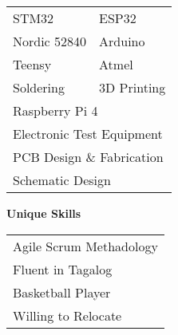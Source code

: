\documentclass[10pt,letterpaper]{article}
\def\bulletspace{0.1mm} %
\newcommand{\bulletp}{
    \textbullet \hspace{\bulletspace}
}
\begin{document}
\begin{paracol}{2}
\begin{leftcolumn}
    \vspace{-0.55em}
    \raggedright{
        \begin{table}[h!]
            \begin{tabular}{p{7em} p{7em}}
                \bulletp STM32 & \bulletp ESP32\\
                \bulletp Nordic 52840 & \bulletp Arduino\\
                \bulletp Teensy & \bulletp Atmel\\
                \bulletp Soldering & \bulletp3D Printing\\
                \multicolumn{2}{l}{\bulletp Raspberry Pi 4}\\
                \multicolumn{2}{l}{\bulletp Electronic Test Equipment}\\
                \multicolumn{2}{l}{\bulletp PCB Design \& Fabrication}\\
                \multicolumn{2}{l}{\bulletp Schematic Design}\\
            \end{tabular}
        \end{table}
    }
    \vspace{-10pt}
    \large{\textbf{Unique Skills} }\\
    \vspace{-0.55em}
    \raggedright{
        \begin{table}[h!]
            \begin{tabular}{p{14em}}
                \bulletp Agile Scrum Methadology\\
                \bulletp Fluent in Tagalog\\
                \bulletp Basketball Player\\
                \bulletp Willing to Relocate\\
            \end{tabular}
        \end{table}
    }
\end{leftcolumn}
\begin{rightcolumn}
    \begin{center}
        \begin{tcolorbox}[colback=red!54!green!71!blue!79,%
            colframe=black,
            width= 0.95\columnwidth,
           ]
           \begin{center}

\end{center}
\end{tcolorbox}
\end{center}
\end{rightcolumn}
\end{paracol}
\end{document}

